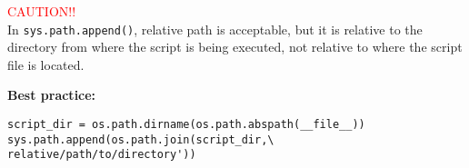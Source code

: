 \begin{mdframed}[backgroundcolor=magenta!10,linecolor=magenta]
    \vspace{6pt}
    \textcolor{red}{CAUTION!!}\\
    \vspace{1pt}
    In \texttt{sys.path.append()}, relative path is acceptable, but it is relative to the directory from where the script is being executed, not relative to where the script file is located.\\

\end{mdframed}
\begin{mdframed}[backgroundcolor=magenta!10,linecolor=magenta]

    \textbf{Best practice:}\\
    \vspace{-16pt}
        \begin{verbatim}
script_dir = os.path.dirname(os.path.abspath(__file__))
sys.path.append(os.path.join(script_dir,\
relative/path/to/directory'))
        \end{verbatim}
\end{mdframed}

\pagebreak